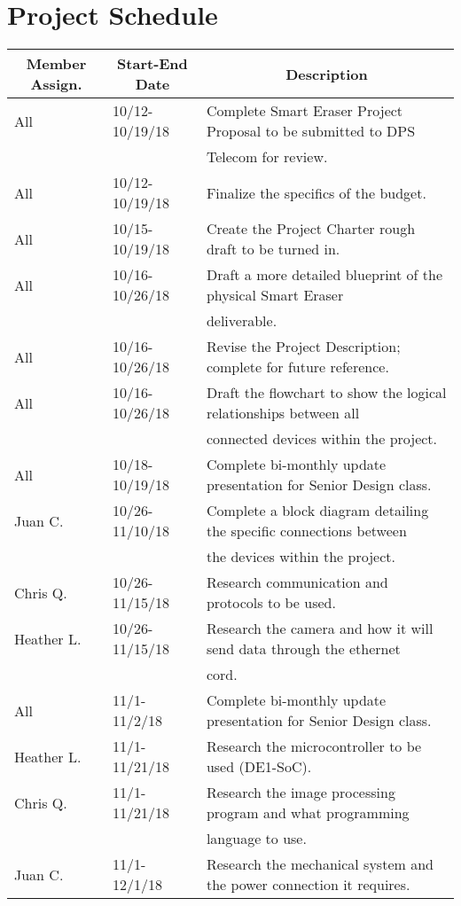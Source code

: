 \documentclass[10pt,onecolumn,draftclsnofoot]{IEEEtran} 					%
\begin{document}
	\section{Project Schedule}
	\setlength{\parindent}{5ex}
	\begin{table} [H]	
	    \normalsize
		\centering
			\begin{tabular}{|l|l|l|}
				\hline
				\multicolumn{1}{|c|}{\textbf{Member Assign.}} & \multicolumn{1}{|c|}{\textbf{Start-End Date}} & \multicolumn{1}{|c|}{\textbf{Description}} \\
				\hline
					All & 10/12-10/19/18 & Complete Smart Eraser Project Proposal to be submitted to DPS\\
					& & Telecom for review. \\
				\hline
					All & 10/12-10/19/18 & Finalize the specifics of the budget. \\
				\hline
					All & 10/15-10/19/18 & 
					Create the Project Charter rough draft to be turned in.\\
				\hline
					All & 10/16-10/26/18 & Draft a more detailed blueprint of the physical Smart Eraser \\
					& & deliverable. \\
				\hline
					All & 10/16-10/26/18 & 
					Revise the Project Description; complete for future reference.\\
				\hline
					All & 10/16-10/26/18 & 
					Draft the flowchart to show the logical relationships between all \\
					& & connected devices within the project.\\
				\hline
					All & 10/18-10/19/18 & 
					Complete bi-monthly update presentation for Senior Design class.\\
				\hline
					Juan C. & 10/26-11/10/18 & 
					Complete a block diagram detailing the specific connections between \\
					& & the devices within the project.\\
				\hline
					Chris Q. & 10/26-11/15/18 & 
					Research communication and protocols to be used.\\
				\hline
					Heather L. & 10/26-11/15/18 & 
					Research the camera and how it will send data through the ethernet \\
					& & cord.\\
				\hline
					All & 11/1-11/2/18 & 
					Complete bi-monthly update presentation for Senior Design class.\\
				\hline
					Heather L. & 11/1-11/21/18 & 
					Research the microcontroller to be used  (DE1-SoC).\\
				\hline
					Chris Q. & 11/1-11/21/18 & 
					Research the image processing program and what programming \\
					& & language to use.\\
				\hline
					Juan C. & 11/1-12/1/18 &
					Research the mechanical system and the power connection it requires. \\
				\hline
				

\end{tabular}
\end{table}
\end{document}
